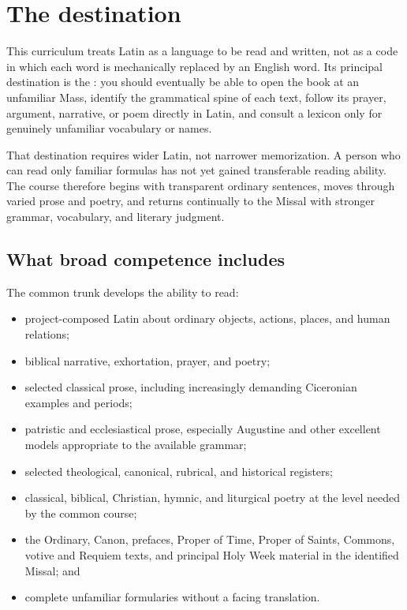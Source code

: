 \chapter{The destination}

This curriculum treats Latin as a language to be read and written, not as a
code in which each word is mechanically replaced by an English word. Its
principal destination is the \Missal: you should eventually be able to open
the book at an unfamiliar Mass, identify the grammatical spine of each text,
follow its prayer, argument, narrative, or poem directly in Latin, and consult
a lexicon only for genuinely unfamiliar vocabulary or names.

That destination requires wider Latin, not narrower memorization. A person who
can read only familiar formulas has not yet gained transferable reading
ability. The course therefore begins with transparent ordinary sentences,
moves through varied prose and poetry, and returns continually to the Missal
with stronger grammar, vocabulary, and literary judgment.

\section{What broad competence includes}

The common trunk develops the ability to read:

\begin{itemize}
  \item project-composed Latin about ordinary objects, actions, places, and
        human relations;
  \item biblical narrative, exhortation, prayer, and poetry;
  \item selected classical prose, including increasingly demanding Ciceronian
        examples and periods;
  \item patristic and ecclesiastical prose, especially Augustine and other
        excellent models appropriate to the available grammar;
  \item selected theological, canonical, rubrical, and historical registers;
  \item classical, biblical, Christian, hymnic, and liturgical poetry at the
        level needed by the common course;
  \item the Ordinary, Canon, prefaces, Proper of Time, Proper of Saints,
        Commons, votive and Requiem texts, and principal Holy Week material in
        the identified Missal; and
  \item complete unfamiliar formularies without a facing translation.
\end{itemize}

